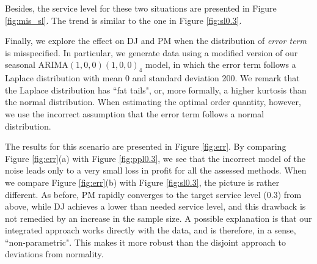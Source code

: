 \documentclass{article}
\begin{document}
Besides, the service level for these two situations are presented in Figure \ref{fig:mis_sl}. The trend is similar to the one in Figure \ref{fig:sl0.3}.

Finally, we explore the effect on DJ and PM when the distribution of \emph{error term} is misspecified. In particular, we generate data using a modified version of our seasonal ARIMA$(1,0,0)(1,0,0)_4$ model, in which the error term follows a Laplace distribution with mean 0 and standard deviation 200. We remark that the Laplace distribution has ``fat tails", or, more formally, a higher kurtosis than the normal distribution. When estimating the optimal order quantity, however, we use the incorrect assumption that the error term follows a normal distribution.

The results for this scenario are presented in Figure \ref{fig:err}.
By comparing Figure \ref{fig:err}(a) with Figure \ref{fig:ppl0.3}, we see that the incorrect model of the noise leads only to a very small loss in profit for all the assessed methods. When we compare Figure \ref{fig:err}(b) with Figure \ref{fig:sl0.3}, the picture is rather different. As before, PM rapidly converges to the target service level (0.3) from above, while DJ achieves a lower than needed service level, and this drawback is not remedied by an increase in the sample size. A possible explanation is that our integrated approach works directly with the data, and is therefore, in a sense, ``non-parametric". This makes it more robust than the disjoint approach to deviations from normality.
\end{document}
